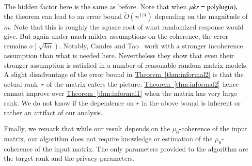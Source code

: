 \documentclass[letterpaper,11pt]{article}
\theoremstyle{definition}
\newcommand{\theoremref}[1]{\hyperref[thm:#1]{Theorem~\ref{thm:#1}}}
\newcommand{\polylog}{{\rm polylog}}
\begin{document}
The hidden factor here is the same as before.   Note that
when $\mu kr=\polylog(n),$ the theorem can lead to an error bound $\tilde
O\left(n^{1/4}\right)$ depending on the magnitude of $m.$ Note that this is
roughly the square root of what randomized response would give. But again under
much milder assumptions on the coherence, the error remains
$o\left(\sqrt{kn}\right).$ Notably, Candes and Tao~\cite{CandesT10} work
with a stronger incoherence assumption than what is needed here.
Nevertheless they show that even their stronger assumption is
satisfied in a number of reasonable random matrix models. A slight
disadvantage of the error bound in \theoremref{informal2} is that the actual
rank~$r$ of the matrix enters the picture. \theoremref{informal2} hence cannot
improve over \theoremref{informal1} when the matrix has very large rank. We do
not know if the dependence on $r$ in the above bound is inherent or rather an
artifact of our analysis.

Finally, we remark that while our result depends on the $\mu_0$-coherence of the input
matrix, our algorithm does not require knowledge or estimation of the
$\mu_0$-coherence of the input matrix. The only parameters provided to the algorithm
are the target rank and the privacy parameters.
\end{document}
